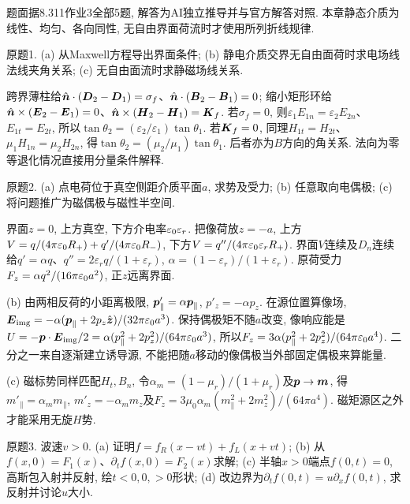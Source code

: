 题面据8.311作业3全部5题, 解答为AI独立推导并与官方解答对照. 本章静态介质为线性、均匀、各向同性, 无自由界面荷流时才使用所列折线规律.
\begin{exercise}
原题1. (a) 从Maxwell方程导出界面条件; (b) 静电介质交界无自由面荷时求电场线法线夹角关系; (c) 无自由面流时求静磁场线关系.
\end{exercise}
\begin{solution}
跨界薄柱给$\hat{\boldsymbol{n}}\cdot(\boldsymbol{D}_2-\boldsymbol{D}_1)=\sigma_f$、$\hat{\boldsymbol{n}}\cdot(\boldsymbol{B}_2-\boldsymbol{B}_1)=0$; 缩小矩形环给$\hat{\boldsymbol{n}}\times(\boldsymbol{E}_2-\boldsymbol{E}_1)=0$、$\hat{\boldsymbol{n}}\times(\boldsymbol{H}_2-\boldsymbol{H}_1)=\boldsymbol{K}_f$. 若$\sigma_f=0$, 则$\varepsilon_1E_{1n}=\varepsilon_2E_{2n}$、$E_{1t}=E_{2t}$, 所以$\tan\theta_2=(\varepsilon_2/\varepsilon_1)\tan\theta_1$. 若$\boldsymbol{K}_f=0$, 同理$H_{1t}=H_{2t}$、$\mu_1H_{1n}=\mu_2H_{2n}$, 得$\tan\theta_2=(\mu_2/\mu_1)\tan\theta_1$. 后者亦为$B$方向的角关系. 法向为零等退化情况直接用分量条件解释.
\end{solution}
\begin{exercise}
原题2. (a) 点电荷位于真空侧距介质平面$a$, 求势及受力; (b) 任意取向电偶极; (c) 将问题推广为磁偶极与磁性半空间.
\end{exercise}
\begin{solution}
界面$z=0$, 上方真空, 下方介电率$\varepsilon_0\varepsilon_r$. 把像荷放$z=-a$, 上方$V=q/(4\pi\varepsilon_0 R_+)+q'/(4\pi\varepsilon_0 R_-)$, 下方$V=q''/(4\pi\varepsilon_0\varepsilon_r R_+)$. 界面$V$连续及$D_n$连续给$q'=\alpha q$、$q''=2\varepsilon_rq/(1+\varepsilon_r)$, $\alpha=(1-\varepsilon_r)/(1+\varepsilon_r)$. 原荷受力$F_z=\alpha q^2/(16\pi\varepsilon_0 a^2)$, 正$z$远离界面.

(b) 由两相反荷的小距离极限, $\boldsymbol{p}'_{\parallel}=\alpha\boldsymbol{p}_{\parallel}$, $p'_z=-\alpha p_z$. 在源位置算像场, $\boldsymbol{E}_{\rm img}=-\alpha(\boldsymbol{p}_\parallel+2p_z\hat{\boldsymbol{z}})/(32\pi\varepsilon_0 a^3)$. 保持偶极矩不随$a$改变, 像响应能是$U=-\boldsymbol{p}\cdot\boldsymbol{E}_{\rm img}/2=\alpha(p_\parallel^2+2p_z^2)/(64\pi\varepsilon_0 a^3)$, 所以$F_z=3\alpha(p_\parallel^2+2p_z^2)/(64\pi\varepsilon_0 a^4)$. 二分之一来自逐渐建立诱导源, 不能把随$a$移动的像偶极当外部固定偶极来算能量.

(c) 磁标势同样匹配$H_t,B_n$, 令$\alpha_m=(1-\mu_r)/(1+\mu_r)$及$\boldsymbol{p}\to\boldsymbol{m}$, 得$m'_\parallel=\alpha_m m_\parallel$, $m'_z=-\alpha_m m_z$及$F_z=3\mu_0\alpha_m(m_\parallel^2+2m_z^2)/(64\pi a^4)$. 磁矩源区之外才能采用无旋$H$势.
\end{solution}
\begin{exercise}
原题3. 波速$v>0$. (a) 证明$f=f_R(x-vt)+f_L(x+vt)$; (b) 从$f(x,0)=F_1(x)$、$\partial_tf(x,0)=F_2(x)$求解; (c) 半轴$x>0$端点$f(0,t)=0$, 高斯包入射并反射, 绘$t<0,0,>0$形状; (d) 改边界为$\partial_tf(0,t)=u\partial_xf(0,t)$, 求反射并讨论$u$大小.
\end{exercise}
